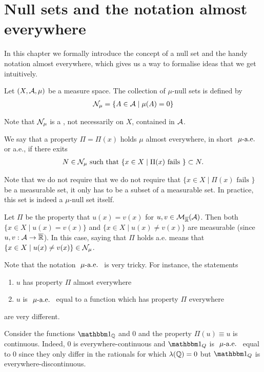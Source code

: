 
\chapter{Null sets and the notation almost everywhere}

In this chapter we formally introduce the concept of a null set and the handy notation almost everywhere, which gives us a way to formalise ideas that we get intuitively.

\begin{dfn}
	\label{dfn:mu-null-set}
	Let $(X, \mathcal{A}, \mu)$ be a measure space. The collection of $\mu$-null sets is defined by
	\begin{align}
		\mathcal{N}_\mu = \left\{ A \in \mathcal{A} \mid \mu(A) = 0 \right\}
	\end{align}
\end{dfn}

Note that $\mathcal{N}_\mu$ is a \siga, not necessarily on $X$, contained in $\mathcal{A}$.

\begin{dfn}
	\label{dfn:almost-everyhere}
	We say that a property $\Pi = \Pi(x)$ holds $\mu$ almost everywhere, in short $\ \mu\text{-a.e. }$ or a.e., if there exits
	\begin{align}
		N \in \mathcal{N}_\mu \text{ such that } \{x \in X \mid \Pi(x) \text{ fails }\} \subset N.
	\end{align}
\end{dfn}

Note that we do not require that we do not require that $\{x \in X \mid \Pi(x) \text{ fails }\}$ be a measurable set, it only has to be a subset of a measurable set. In practice, this set is indeed a $\mu$-null set itself.

\begin{eg}
	Let $\Pi$ be the property that $u(x) = v(x)$ for $u, v \in \mathcal{M}_{\overline{\mathbb{R}}}(\mathcal{A})$. Then both $\{x \in X \mid u(x) = v(x)\}$ and $\{x \in X \mid u(x) \neq v(x)\}$ are measurable (since $u, v : \mathcal{A} \to {\overline{\mathbb{R}}}$). In this case, saying that $\Pi$ holds a.e. means that $\{x \in X \mid u(x) \neq v(x)\} \in \mathcal{N}_\mu$.
\end{eg}

\begin{remark}
	Note that the notation $\ \mu\text{-a.e. }$ is very tricky. For instance, the statements
	\begin{enumerate}
		\item $u$ has property $\Pi$ almost everywhere
		\item $u$ is $\ \mu\text{-a.e. }$ equal to a function which has property $\Pi$ everywhere
	\end{enumerate}
	are very different.
	
	Consider the functions $\ind_{\Q}$ and $0$ and the property $\Pi(u) \equiv u$ is continuous. Indeed, $0$ is everywhere-continuous and $\ind_Q$ is $\ \mu\text{-a.e. }$ equal to $0$ since they only differ in the rationals for which $\lambda(\mathbb{Q}) = 0$ but $\ind_Q$ is everywhere-discontinuous.
\end{remark}

